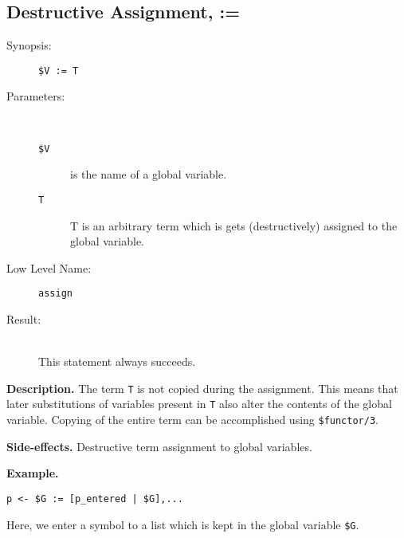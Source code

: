 %
%
%
\subsection{Destructive Assignment, :=}

\begin{description}
\item[Synopsis:]
	{\tt \$V := T}
\item[Parameters:]\ \\[-0.5cm]
	\begin{description}
	\item[{\tt \$V}]
is the name of a global variable.
	\item[{\tt T}]

T is an arbitrary term which is gets (destructively) assigned
to the global variable.


	\end{description}
\item[Low Level Name:]
	{\tt assign}
\item[Result:]\ \\
This statement always succeeds.
\end{description}

\vspace*{0.5cm}
\noindent
{\bf Description.}
The term {\tt T} is not copied during the assignment.
This means that later substitutions of variables present in {\tt T}
also alter the contents of the global variable.
Copying of the entire term can be accomplished using
{\tt \$functor/3}.

\vspace*{0.5cm}
\noindent
{\bf Side-effects.}
Destructive term assignment to global variables.

\vspace*{0.5cm}
\noindent
{\bf Example.}
\begin{verbatim}
p <- $G := [p_entered | $G],...
\end{verbatim}

Here, we enter a symbol to a list which is kept in the global
variable {\tt \$G}.





